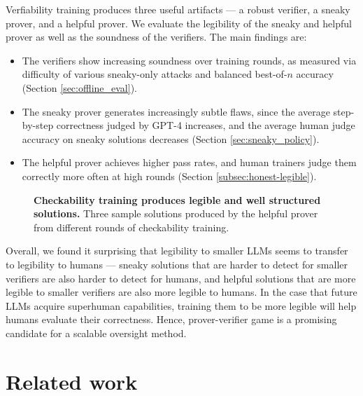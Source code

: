 \documentclass{article}
\begin{document}
Verfiability training produces three useful artifacts --- a robust verifier, a sneaky prover, and a helpful prover. We evaluate the legibility of the sneaky and helpful prover as well as the soundness of the verifiers. The main findings are:
\begin{itemize}
    \item The verifiers show increasing soundness over training rounds, as measured via difficulty of various sneaky-only attacks and balanced best-of-$n$ accuracy (Section \ref{sec:offline_eval}).
    \item The sneaky prover generates increasingly subtle flaws, since the average step-by-step correctness judged by GPT-4 increases, and the average human judge accuracy on sneaky solutions decreases (Section \ref{sec:sneaky_policy}).
    \item The helpful prover achieves higher pass rates, and human trainers judge them correctly more often at high rounds (Section \ref{subsec:honest-legible}).
\end{itemize}


\begin{figure}
    \centering
    \caption{\textbf{Checkability training produces legible and well structured solutions.} Three sample solutions produced by the helpful prover from different rounds of checkability training.}
    \label{fig:helpful-examples}
\end{figure}

Overall, we found it surprising that legibility to smaller LLMs seems to transfer to legibility to humans --- sneaky solutions that are harder to detect for smaller verifiers are also harder to detect for humans, and helpful solutions that are more legible to smaller verifiers are also more legible to humans. In the case that future LLMs acquire superhuman capabilities, training them to be more legible will help humans evaluate their correctness. Hence, prover-verifier game is a promising candidate for a scalable oversight method.

\section{Related work}
\label{sec:related_works}
\end{document}
